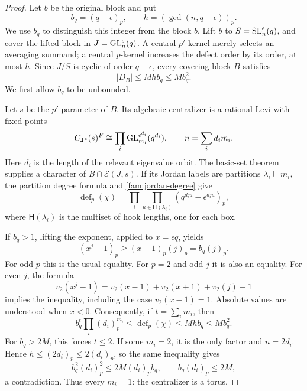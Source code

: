 \begin{proof}
Let \(b\) be the original block and put
\[
 b_q=(q-\epsilon)_p,\qquad
 h=(\gcd(n,q-\epsilon))_p.
\]
We use \(b_q\) to distinguish this integer from the block \(b\).
Lift \(b\) to \(S=\operatorname{SL}_n^\epsilon(q)\), and cover the lifted block
in \(J=\operatorname{GL}_n^\epsilon(q)\).  A central \(p'\)-kernel merely selects
an averaging summand; a central \(p\)-kernel increases the defect
order by its order, at most \(h\).  Since \(J/S\) is cyclic of
order \(q-\epsilon\), every covering block \(B\) satisfies
\begin{equation}\label{fam:a-cover-defect}
 |D_B|\leq Mhb_q\leq Mb_q^2.
\end{equation}
We first allow \(b_q\) to be unbounded.

Let \(s\) be the \(p'\)-parameter of \(B\).  Its algebraic centralizer
is a rational Levi with fixed points
\begin{equation}\label{fam:a-centralizer}
 C_{\mathbf J^*}(s)^F
   \cong\prod_i\operatorname{GL}_{m_i}^{\epsilon^{d_i}}(q^{d_i}),
 \qquad n=\sum_i d_i m_i.
\end{equation}
Here \(d_i\) is the length of the relevant eigenvalue orbit.  The
basic-set theorem supplies a character of \(B\cap\mathcal E(J,s)\).
If its Jordan labels are partitions \(\lambda_i\vdash m_i\), the
partition degree formula and \eqref{fam:jordan-degree} give
\begin{equation}\label{fam:a-hook-defect}
 \operatorname{def}_p(\chi)
  =\prod_i\prod_{u\in\mathsf H(\lambda_i)}
       (q^{d_i u}-\epsilon^{d_i u})_p,
\end{equation}
where \(\mathsf H(\lambda_i)\) is the multiset of hook lengths, one
for each box.

If \(b_q>1\), lifting the exponent, applied to
\(x=\epsilon q\), yields
\begin{equation}\label{fam:a-lte}
 (x^j-1)_p\geq (x-1)_p(j)_p=b_q(j)_p.
\end{equation}
For odd \(p\) this is the usual equality.  For \(p=2\) and odd \(j\)
it is also an equality.  For even \(j\), the formula
\[
 v_2(x^j-1)=v_2(x-1)+v_2(x+1)+v_2(j)-1
\]
implies the inequality, including the case \(v_2(x-1)=1\).
Absolute values are understood when \(x<0\).
Consequently, if \(t=\sum_i m_i\), then
\begin{equation}\label{fam:a-multiplicity}
 b_q^t\prod_i(d_i)_p^{m_i}
 \leq\operatorname{def}_p(\chi)
 \leq Mhb_q\leq Mb_q^2.
\end{equation}
For \(b_q>2M\), this forces \(t\leq2\).  If some \(m_i=2\), it
is the only factor and \(n=2d_i\).  Hence
\(h\leq(2d_i)_p\leq2(d_i)_p\), so the same inequality gives
\[
 b_q^2(d_i)_p^2\leq2M(d_i)_p b_q,
 \qquad b_q(d_i)_p\leq2M,
\]
a contradiction.  Thus every \(m_i=1\): the centralizer is a torus.


\end{proof}
